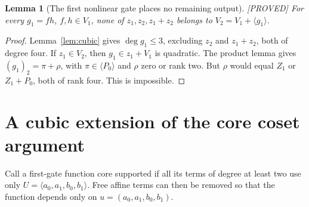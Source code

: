 \documentclass[11pt,a4paper]{article}
\newtheorem{lemma}[theorem]{Lemma}
\newcommand{\status}[1]{\hfill\textsf{[#1]}}
\begin{document}
\begin{lemma}[The first nonlinear gate places no remaining output]\label{lem:first}\status{PROVED}
For every $g_1=fh$, $f,h\in V_1$, none of $z_1,z_2,z_1+z_2$ belongs to $V_2=V_1+\langle g_1\rangle$.
\end{lemma}
\begin{proof}
Lemma~\ref{lem:cubic} gives $\deg g_1\le3$, excluding $z_2$ and $z_1+z_2$, both of degree four. If $z_1\in V_2$, then $g_1\in z_1+V_1$ is quadratic. The product lemma gives $(g_1)_2=\pi+\rho$, with $\pi\in\langle P_0\rangle$ and $\rho$ zero or rank two. But $\rho$ would equal $Z_1$ or $Z_1+P_0$, both of rank four. This is impossible.
\end{proof}

\section{A cubic extension of the core coset argument}
Call a first-gate function core supported if all its terms of degree at least two use only $U=\langle a_0,a_1,b_0,b_1\rangle$. Free affine terms can then be removed so that the function depends only on $u=(a_0,a_1,b_0,b_1)$.
\end{document}
